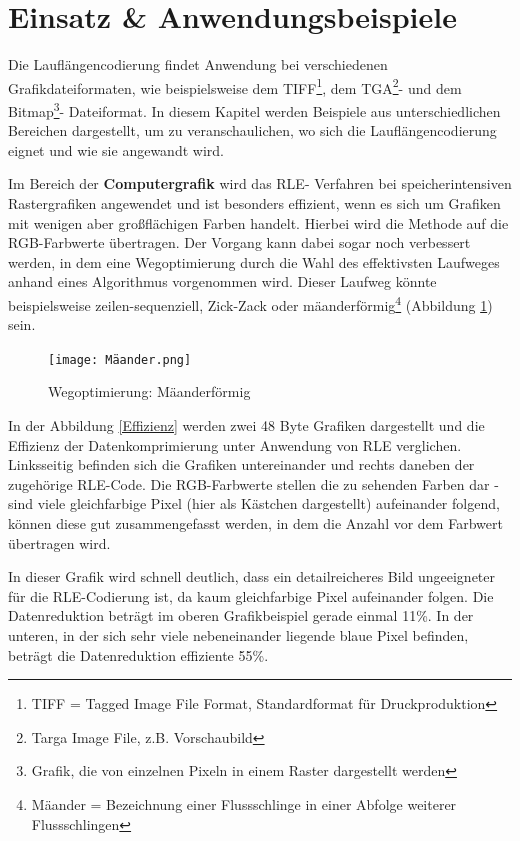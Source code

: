 \documentclass[11pt,a4paper,ngerman]{report}
\begin{document}
		
		
		
		
		\section{Einsatz \& Anwendungsbeispiele}
		Die Lauflängencodierung findet Anwendung bei verschiedenen Grafikdateiformaten, wie beispielsweise dem TIFF\footnote{TIFF = Tagged Image File Format, Standardformat für Druckproduktion}, dem TGA\footnote{Targa Image File, z.B. Vorschaubild}- und dem Bitmap\footnote{Grafik, die von einzelnen Pixeln in einem Raster dargestellt werden}- Dateiformat. In diesem Kapitel werden  Beispiele aus unterschiedlichen Bereichen dargestellt, um zu veranschaulichen, wo sich die Lauflängencodierung eignet und wie sie angewandt wird.
	
		Im Bereich der \textbf{Computergrafik} wird das RLE- Verfahren bei speicherintensiven Rastergrafiken angewendet und ist besonders effizient, wenn es sich um Grafiken mit wenigen aber großflächigen Farben handelt. Hierbei wird die Methode auf die RGB-Farbwerte übertragen. Der Vorgang kann dabei sogar noch verbessert werden, in dem eine Wegoptimierung durch die Wahl des effektivsten Laufweges anhand eines Algorithmus vorgenommen wird.  Dieser Laufweg könnte beispielsweise zeilen-sequenziell, Zick-Zack oder mäanderförmig\footnote{Mäander = Bezeichnung einer Flussschlinge in einer Abfolge weiterer Flussschlingen } (Abbildung \ref{mäander}) sein.
		
		 \begin{figure} [H]
			\begin{center}
				\texttt{[image: Mäander.png]}
				\caption{Wegoptimierung: Mäanderförmig}
				\cite{kocerheiztech}
				\label{mäander}
			\end{center}
		\end{figure}
	  
		In der Abbildung \ref{Effizienz} werden zwei 48 Byte Grafiken dargestellt und die Effizienz der Datenkomprimierung unter Anwendung von RLE verglichen. Linksseitig befinden sich die Grafiken untereinander und rechts daneben der zugehörige RLE-Code. Die RGB-Farbwerte stellen die zu sehenden Farben dar - sind viele gleichfarbige Pixel (hier als Kästchen dargestellt) aufeinander folgend, können diese gut zusammengefasst werden, in dem die Anzahl vor dem Farbwert übertragen wird. 
			
		In dieser Grafik  wird  schnell deutlich, dass ein detailreicheres Bild ungeeigneter für die RLE-Codierung ist, da kaum gleichfarbige Pixel aufeinander folgen. Die Datenreduktion beträgt im oberen Grafikbeispiel gerade einmal 11\%. In der unteren, in der sich sehr viele nebeneinander liegende blaue Pixel befinden, beträgt die Datenreduktion effiziente 55\%.
				
\end{document}
